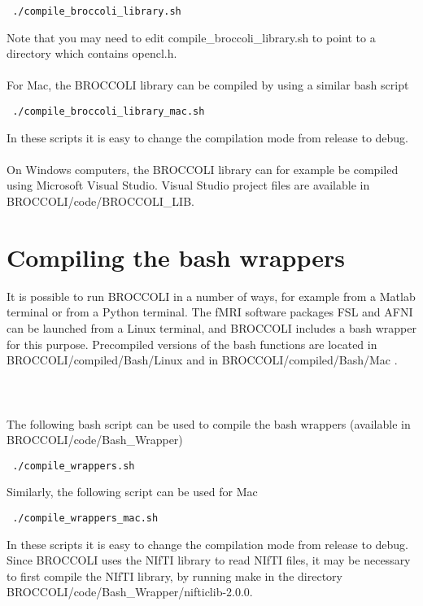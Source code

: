 \begin{verbatim}
 ./compile_broccoli_library.sh 
\end{verbatim}
Note that you may need to edit compile\_broccoli\_library.sh to point to a directory which contains opencl.h. \\ \\ For Mac, the BROCCOLI library can be compiled by using a similar bash script

\begin{verbatim}
 ./compile_broccoli_library_mac.sh 
\end{verbatim}
In these scripts it is easy to change the compilation mode from release to debug. \\ \\ On Windows computers, the BROCCOLI library can for example be compiled using Microsoft Visual Studio. Visual Studio project files are available in BROCCOLI/code/BROCCOLI\_LIB. 

\section{Compiling the bash wrappers}

It is possible to run BROCCOLI in a number of ways, for example from a Matlab terminal or from a Python terminal. The fMRI software packages FSL and AFNI can be launched from a Linux terminal, and BROCCOLI includes a bash wrapper for this purpose. Precompiled versions of the bash functions are located in BROCCOLI/compiled/Bash/Linux and in BROCCOLI/compiled/Bash/Mac . \\ \\ \\ \\ The following bash script can be used to compile the bash wrappers (available in BROCCOLI/code/Bash\_Wrapper)

\begin{verbatim}
 ./compile_wrappers.sh 
\end{verbatim}
Similarly, the following script can be used for Mac

\begin{verbatim}
 ./compile_wrappers_mac.sh 
\end{verbatim}
In these scripts it is easy to change the compilation mode from release to debug. Since BROCCOLI uses the NIfTI library to read NIfTI files, it may be necessary to first compile the NIfTI library, by running make in the directory BROCCOLI/code/Bash\_Wrapper/nifticlib-2.0.0.

